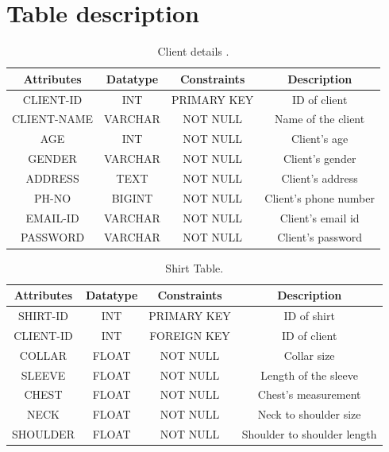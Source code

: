 \documentclass[12pt, letter paper]{report}
\begin{document}
{\section{Table description} 
\begin{center}
\begin{table}[h!]
\centering
    \begin{tabular}{|c|c|c|c|}
    \hline
      Attributes &Datatype &Constraints&Description  \\
      \hline
      \hline
         CLIENT-ID&INT&PRIMARY KEY&ID of client  \\
         \hline
         CLIENT-NAME&VARCHAR&NOT NULL& Name of the client\\ 
         \hline
         AGE&INT&NOT NULL& Client's age\\ 
         \hline
         GENDER&VARCHAR&NOT NULL&Client's gender\\
         \hline
         ADDRESS&TEXT&NOT NULL&Client's address\\
         \hline
         PH-NO&BIGINT&NOT NULL&Client's phone number\\
         \hline
         EMAIL-ID&VARCHAR&NOT NULL&Client's email id\\
         \hline
         PASSWORD&VARCHAR&NOT NULL&Client's password\\
         \hline
    \end{tabular}
    \caption{Client details .}
\label{table:1}
    \end{table}
\end{center}

\begin{center}
\begin{table}[h!]
\centering
    \begin{tabular}{|c|c|c|c|}
    \hline
      Attributes &Datatype &Constraints&Description  \\
      \hline
      \hline
         SHIRT-ID&INT&PRIMARY KEY&ID of shirt  \\
         \hline
         CLIENT-ID&INT&FOREIGN KEY&ID of client\\
         \hline
         COLLAR&FLOAT&NOT NULL& Collar size\\ 
         \hline
         SLEEVE&FLOAT&NOT NULL& Length of the sleeve\\ 
         \hline
         CHEST&FLOAT&NOT NULL& Chest's measurement\\
         \hline
         NECK&FLOAT&NOT NULL&Neck to shoulder size\\
         \hline
         SHOULDER&FLOAT&NOT NULL&Shoulder to shoulder length\\
         \hline
    \end{tabular}
    \caption{Shirt Table.}
\label{table:2}
    \end{table}
\end{center}

}
\end{document}
